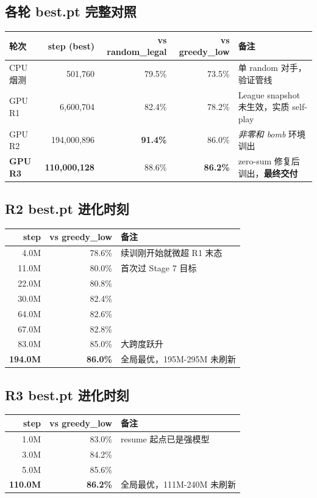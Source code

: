 \documentclass[twocolumn,a4paper,10pt]{ctexart}
\begin{document}
\subsection*{各轮 best.pt 完整对照}

\begin{tabularx}{\textwidth}{@{}l r r r X@{}}
\toprule
轮次 & step (best) & vs random\_legal & vs greedy\_low & 备注 \\
\midrule
CPU 烟测  & 501,760     & 79.5\% & 73.5\% & 单 random 对手，验证管线 \\
GPU R1    & 6,600,704   & 82.4\% & 78.2\% & League snapshot 未生效，实质 self-play \\
GPU R2    & 194,000,896 & \textbf{91.4\%} & 86.0\% & \cellcolor{buggycell}\emph{非零和 bomb} 环境训出 \\
\textbf{GPU R3} & \textbf{110,000,128} & 88.6\% & \cellcolor{bestcell}\textbf{86.2\%} & \cellcolor{bestcell}zero-sum 修复后训出，\textbf{最终交付} \\
\bottomrule
\end{tabularx}

\subsection*{R2 best.pt 进化时刻}

\begin{tabularx}{0.7\textwidth}{@{}r r X@{}}
\toprule
step & vs greedy\_low & 备注 \\
\midrule
4.0M   & 78.6\% & 续训刚开始就微超 R1 末态 \\
11.0M  & 80.0\% & 首次过 Stage 7 目标 \\
22.0M  & 80.8\% & \\
30.0M  & 82.4\% & \\
64.0M  & 82.6\% & \\
67.0M  & 82.8\% & \\
83.0M  & 85.0\% & 大跨度跃升 \\
\textbf{194.0M} & \textbf{86.0\%} & 全局最优，195M-295M 未刷新 \\
\bottomrule
\end{tabularx}

\subsection*{R3 best.pt 进化时刻}

\begin{tabularx}{0.7\textwidth}{@{}r r X@{}}
\toprule
step & vs greedy\_low & 备注 \\
\midrule
1.0M   & 83.0\% & resume 起点已是强模型 \\
3.0M   & 84.2\% & \\
5.0M   & 85.6\% & \\
\textbf{110.0M} & \textbf{86.2\%} & 全局最优，111M-240M 未刷新 \\
\bottomrule
\end{tabularx}
\end{document}
